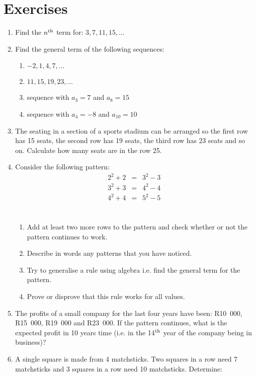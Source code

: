 \documentclass[10pt,a4paper,titlepage,twoside,openright]{report}
\begin{document}
\section{Exercises}
\begin{enumerate}
\item{Find the $n^{\rm{th}}$ term for: $3, 7, 11, 15, \ldots$}
\item{Find the general term of the following sequences:
\begin{enumerate}
\item $-2,1,4,7,\ldots$
\item $11, 15, 19, 23, \ldots$
\item sequence with $a_3=7$ and $a_8=15$
\item sequence with $a_4=-8$ and $a_{10}=10$
\end{enumerate}}
\item{The seating in a section of a sports stadium can be arranged so the first row has 15 seats, the second row has 19 seats, the third row has 23 seats and so on. Calculate how many seats are in the row 25.}
\item{Consider the following pattern:}
\begin{eqnarray*}
2^2+2&=&3^2-3\\
3^2+3&=&4^2-4\\
4^2+4&=&5^2-5\\
\end{eqnarray*}	\\
\begin{enumerate}
\item{Add at least two more rows to the pattern and check whether or not the pattern continues to work.}
\item{Describe in words any patterns that you have noticed.}
\item{Try to generalise a rule using algebra i.e. find the general term for the pattern.}
\item{Prove or disprove that this rule works for all values.}
\end{enumerate}				
\item{The profits of a small company for the last four years have been: R10~000, R15~000, R19~000 and R23~000. If the pattern continues, what is the expected profit in 10 years time (i.e. in the 14$^{\rm{th}}$ year of the company being in business)?}
\item{A single square is made from 4 matchsticks. Two squares in a row need 7 matchsticks and 3 squares in a row need 10 matchsticks. Determine:
}
\end{enumerate}
\end{document}
